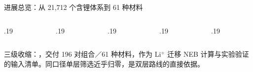 \documentclass[aspectratio=169,10pt]{beamer}
\begin{document}
\begin{frame}[t]{进展总览：从 21{,}712 个含锂体系到 61 种材料}

\vspace{8pt}
\begin{columns}[T,onlytextwidth]
  \begin{column}{.19\textwidth}\end{column}
  \begin{column}{.19\textwidth}\end{column}
  \begin{column}{.19\textwidth}\end{column}
  \begin{column}{.19\textwidth}\end{column}
  \begin{column}{.19\textwidth}\end{column}
\end{columns}

\vspace{6pt}
三级收缩：，交付 196 对组合／61 种材料，作为 Li$^+$ 迁移 NEB 计算与实验验证的输入清单。同口径单层筛选近乎归零，是双层路线的直接依据。
\end{frame}
\end{document}
